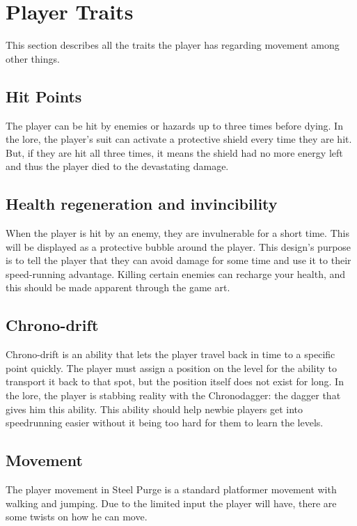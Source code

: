 \documentclass[../Main.tex]{subfiles}
\begin{document}
\section{Player Traits}

This section describes all the traits the player has regarding movement among other things.

\subsection{Hit Points}

The player can be hit by enemies or hazards up to three times before dying. In the lore, the player's suit can activate a protective shield every time they are hit. But, if they are hit all three times, it means the shield had no more energy left and thus the player died to the devastating damage. 


\subsection{Health regeneration and invincibility}

When the player is hit by an enemy, they are invulnerable for a short time. This will be displayed as a protective bubble around the player. This design's purpose is to tell the player that they can avoid damage for some time and use it to their speed-running advantage. Killing certain enemies can recharge your health, and this should be made apparent through the game art. 

\subsection{Chrono-drift}

Chrono-drift is an ability that lets the player travel back in time to a specific point quickly. The player must assign a position on the level for the ability to transport it back to that spot, but the position itself does not exist for long. In the lore, the player is stabbing reality with the Chronodagger: the dagger that gives him this ability. This ability should help newbie players get into speedrunning easier without it being too hard for them to learn the levels.

\subsection{Movement}

The player movement in Steel Purge is a standard platformer movement with walking and jumping. Due to the limited input the player will have, there are some twists on how he can move.
\end{document}
